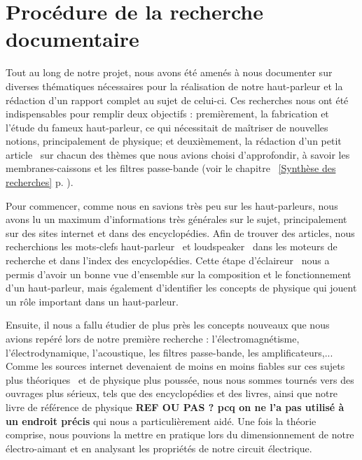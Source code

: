 
\section{Procédure de la recherche documentaire} 
\label{sec:app/demarche}

Tout au long de notre projet, nous avons été amenés à nous documenter sur diverses thématiques nécessaires pour la réalisation de notre haut-parleur et la rédaction d'un rapport complet au sujet de celui-ci.
Ces recherches nous ont été indispensables pour remplir deux objectifs : premièrement, la fabrication et l'étude du fameux haut-parleur, ce qui nécessitait de maîtriser de nouvelles notions, principalement de physique; et deuxièmement, la rédaction d'un petit \og article \fg\ sur chacun des thèmes que nous avions choisi d'approfondir, à savoir les membranes-caissons et les filtres passe-bande (voir le chapitre ~\ref{Synthèse des recherches} p. \pageref{Synthèse des recherches}). %
\newline

Pour commencer, comme nous en savions très peu sur les haut-parleurs, nous avons lu un maximum d’informations très générales sur le sujet, principalement sur des sites internet et dans des encyclopédies. Afin de trouver des articles, nous recherchions les mots-clefs \og haut-parleur \fg\ et \og loudspeaker \fg\ dans les moteurs de recherche et dans l'index des encyclopédies. 
Cette étape \og d'éclaireur \fg\ nous a permis d'avoir un bonne vue d’ensemble sur la composition et le fonctionnement d’un haut-parleur, mais également d'identifier les concepts de physique qui jouent un rôle important dans un haut-parleur.  


Ensuite, il nous a fallu étudier de plus près les concepts nouveaux que nous avions repéré lors de notre première recherche : l'électromagnétisme, l'électrodynamique, l’acoustique, les filtres passe-bande, les amplificateurs,... Comme les sources internet devenaient de moins en moins fiables sur ces sujets plus \og théoriques \fg\ et de physique plus poussée, nous nous sommes tournés vers des ouvrages plus sérieux, tels que des encyclopédies et des livres, ainsi que notre livre de référence de physique \textbf{REF OU PAS ? pcq on ne l'a pas utilisé à un endroit précis} %
qui nous a particulièrement aidé. Une fois la théorie comprise, nous pouvions la mettre en pratique lors du dimensionnement de notre électro-aimant et en analysant les propriétés de notre circuit électrique. 
\newline

